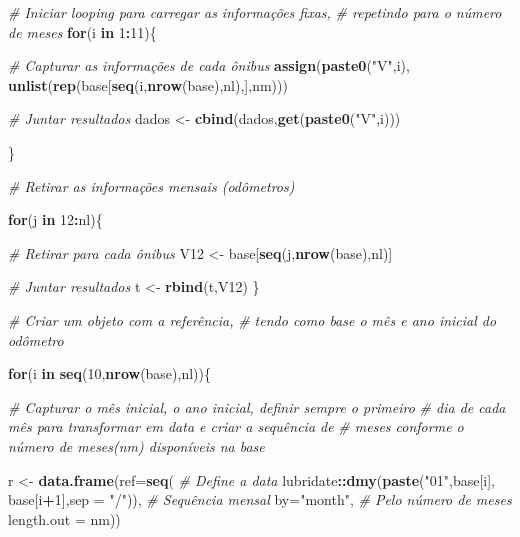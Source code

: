 \documentclass[12pt,a4paper]{article}
\newenvironment{Shaded}{\begin{snugshade}}{\end{snugshade}}
\newcommand{\CommentTok}[1]{\textcolor[rgb]{0.56,0.35,0.01}{\textit{#1}}}
\newcommand{\ControlFlowTok}[1]{\textcolor[rgb]{0.13,0.29,0.53}{\textbf{#1}}}
\newcommand{\DataTypeTok}[1]{\textcolor[rgb]{0.13,0.29,0.53}{#1}}
\newcommand{\DecValTok}[1]{\textcolor[rgb]{0.00,0.00,0.81}{#1}}
\newcommand{\KeywordTok}[1]{\textcolor[rgb]{0.13,0.29,0.53}{\textbf{#1}}}
\newcommand{\NormalTok}[1]{#1}
\newcommand{\OperatorTok}[1]{\textcolor[rgb]{0.81,0.36,0.00}{\textbf{#1}}}
\newcommand{\StringTok}[1]{\textcolor[rgb]{0.31,0.60,0.02}{#1}}
\begin{document}
\begin{Shaded}
\begin{Highlighting}[]
\CommentTok{# Iniciar looping para carregar as informações fixas,}
\CommentTok{# repetindo para o número de meses}
\ControlFlowTok{for}\NormalTok{(i }\ControlFlowTok{in} \DecValTok{1}\OperatorTok{:}\DecValTok{11}\NormalTok{)\{}
  
  \CommentTok{# Capturar as informações de cada ônibus}
  \KeywordTok{assign}\NormalTok{(}\KeywordTok{paste0}\NormalTok{(}\StringTok{"V"}\NormalTok{,i), }\KeywordTok{unlist}\NormalTok{(}\KeywordTok{rep}\NormalTok{(base[}\KeywordTok{seq}\NormalTok{(i,}\KeywordTok{nrow}\NormalTok{(base),nl),],nm)))}
  
  \CommentTok{# Juntar resultados}
\NormalTok{  dados <-}\StringTok{ }\KeywordTok{cbind}\NormalTok{(dados,}\KeywordTok{get}\NormalTok{(}\KeywordTok{paste0}\NormalTok{(}\StringTok{"V"}\NormalTok{,i)))}
  
\NormalTok{\}}

\CommentTok{# Retirar as informações mensais (odômetros)}
  
  \ControlFlowTok{for}\NormalTok{(j }\ControlFlowTok{in} \DecValTok{12}\OperatorTok{:}\NormalTok{nl)\{}
    
    
    \CommentTok{# Retirar para cada ônibus}
\NormalTok{    V12 <-}\StringTok{ }\NormalTok{base[}\KeywordTok{seq}\NormalTok{(j,}\KeywordTok{nrow}\NormalTok{(base),nl)]}
    
    \CommentTok{# Juntar resultados}
\NormalTok{    t <-}\StringTok{ }\KeywordTok{rbind}\NormalTok{(t,V12)}
\NormalTok{\}}

\CommentTok{# Criar um objeto com a referência,}
\CommentTok{# tendo como base o mês e ano inicial do odômetro}

  
  \ControlFlowTok{for}\NormalTok{(i }\ControlFlowTok{in} \KeywordTok{seq}\NormalTok{(}\DecValTok{10}\NormalTok{,}\KeywordTok{nrow}\NormalTok{(base),nl))\{}
    
    \CommentTok{# Capturar o mês inicial, o ano inicial, definir sempre o primeiro}
    \CommentTok{# dia de cada mês para transformar em data e criar a sequência de }
    \CommentTok{# meses conforme o número de meses(nm) disponíveis na base}
    
\NormalTok{    r <-}\StringTok{ }\KeywordTok{data.frame}\NormalTok{(}\DataTypeTok{ref=}\KeywordTok{seq}\NormalTok{(}
      \CommentTok{# Define a data}
\NormalTok{      lubridate}\OperatorTok{::}\KeywordTok{dmy}\NormalTok{(}\KeywordTok{paste}\NormalTok{(}\StringTok{"01"}\NormalTok{,base[i],}
\NormalTok{                           base[i}\OperatorTok{+}\DecValTok{1}\NormalTok{],}\DataTypeTok{sep =} \StringTok{"/"}\NormalTok{)),}
      \CommentTok{# Sequência mensal}
      \DataTypeTok{by=}\StringTok{"month"}\NormalTok{,}
      \CommentTok{# Pelo número de meses}
      \DataTypeTok{length.out =}\NormalTok{ nm))}
  

\end{Highlighting}
\end{Shaded}
\end{document}
